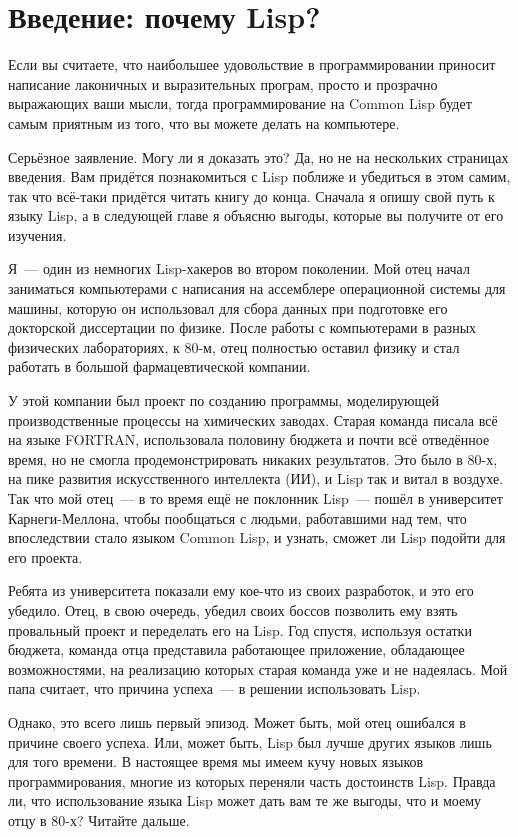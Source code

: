 \chapter{Введение: почему Lisp?}
\label{ch:01}

Если вы считаете, что наибольшее удовольствие в программировании приносит написание
лаконичных и выразительных програм, просто и прозрачно выражающих ваши мысли, тогда
программирование на Common Lisp будет самым приятным из того, что вы можете делать на
компьютере.

Серьёзное заявление. Могу ли я доказать это? Да, но не на нескольких страницах
введения. Вам придётся познакомиться с Lisp поближе и убедиться в этом самим, так что
всё-таки придётся читать книгу до конца. Сначала я опишу свой путь к языку Lisp, а в 
следующей главе я объясню выгоды, которые вы получите от его изучения.

Я~--- один из немногих Lisp-хакеров во втором поколении. Мой отец начал заниматься
компьютерами с написания на ассемблере операционной системы для машины, которую он
использовал для сбора данных при подготовке его докторской диссертации по физике. После
работы с компьютерами в разных физических лабораториях, к 80-м, отец полностью оставил
физику и стал работать в большой фармацевтической компании.

У этой компании был проект по созданию программы, моделирующей производственные процессы
на химических заводах. Старая команда писала всё на языке FORTRAN, использовала половину бюджета и
почти всё отведённое время, но не смогла продемонстрировать никаких результатов. Это было в
80-х, на пике развития искусственного интеллекта (ИИ), и Lisp так и витал в воздухе. Так что
мой отец~--- в то время ещё не поклонник Lisp~--- пошёл в университет Карнеги-Меллона,
чтобы пообщаться с людьми, работавшими над тем, что впоследствии стало языком Common Lisp, и
узнать, сможет ли Lisp подойти для его проекта.

Ребята из университета показали ему кое-что из своих разработок, и это его убедило. Отец,
в свою очередь, убедил своих боссов позволить ему взять провальный проект и переделать его на
Lisp. Год спустя, используя остатки бюджета, команда отца представила работающее
приложение, обладающее возможностями, на реализацию которых старая команда уже и не
надеялась. Мой папа считает, что причина успеха~--- в решении использовать Lisp.

Однако, это всего лишь первый эпизод. Может быть, мой отец ошибался в причине своего
успеха. Или, может быть, Lisp был лучше других языков лишь для того времени. В настоящее
время мы имеем кучу новых языков программирования, многие из которых переняли часть
достоинств Lisp. Правда ли, что использование языка Lisp может дать вам те же выгоды, 
что и моему отцу в 80-х? Читайте дальше.

